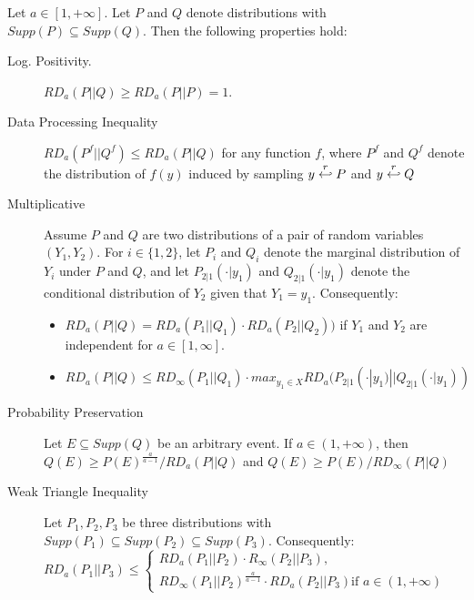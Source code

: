 \begin{lemma}
  Let \(a \in [1, +\infty]\). Let \(P\) and \(Q\) denote distributions with
  \(Supp(P) \subseteq Supp(Q)\). Then the following properties hold:
  \begin{description}
  \item [Log. Positivity.] \(RD_{a}(P || Q) \geq RD_{a}(P||P) = 1\).
  \item[Data Processing Inequality]
    \(RD_{a}(P^{f} || Q^{f}) \leq RD_{a}(P || Q)\) for any function \(f\), where
    \(P^{f}\) and \(Q^{f}\) denote the distribution of \(f(y)\) induced by
    sampling \(y \stackrel{r}{\hookleftarrow} P\) and \(y \stackrel{r}{\hookleftarrow} Q\)
  \item[Multiplicative] Assume \(P\) and \(Q\) are two distributions of a pair
    of random variables \((Y_{1}, Y_{2})\). For \(i \in \{1,2\}\), let \(P_{i}\)
    and \(Q_{i}\) denote the marginal distribution of \(Y_{i}\) under \(P\) and
    \(Q\), and let \(P_{2|1}(\cdot | y_{1})\) and \(Q_{2|1}(\cdot | y_{1})\)
    denote the conditional distribution of \(Y_{2}\) given that
    \(Y_{1} = y_{1}\). Consequently:
    \begin{itemize}
    \item \(RD_{a}(P||Q) = RD_{a}(P_{1}||Q_{1}) \cdot RD_{a}(P_{2}||Q_{2}))\) if
    \(Y_{1}\) and \(Y_{2}\) are independent for \(a \in [1,\infty]\).
    \item
    \(RD_{a}(P||Q) \leq RD_{\infty}(P_{1} || Q_{1}) \cdot max_{y_{1} \in X}
    RD_{a}(P_{2|1}(\cdot | y_{1})||Q_{2|1}(\cdot | y_{1}))\)
    \end{itemize}
  \item[Probability Preservation] Let \(E \subseteq Supp(Q)\) be an arbitrary
    event. If \(a \in (1, +\infty)\), then
    \(Q(E) \geq P(E)^{\frac{a}{a-1}}/RD_{a}(P||Q)\) and
    \(Q(E) \geq P(E)/RD_{\infty}(P||Q)\)
  \item[Weak Triangle Inequality] Let \(P_{1}, P_{2}, P_{3}\) be three
    distributions with
    \(Supp(P_{1}) \subseteq Supp(P_{2}) \subseteq Supp(P_{3})\). Consequently:\\
    \(RD_{a}(P_{1}||P_{3}) \leq
    \begin{cases}
      RD_{a}(P_{1}||P_{2}) \cdot R_{\infty}(P_{2}||P_{3}),\\
      RD_{\infty}(P_{1}||P_{2})^{\frac{a}{a-1}} \cdot RD_{a}(P_{2}||P_{3})
      \text{if } a \in (1,+\infty)
    \end{cases}
\)
  \end{description}
\end{lemma}


